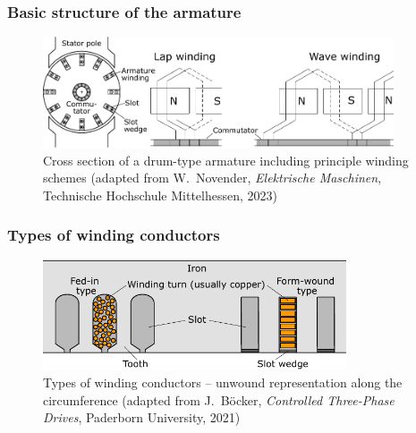 \begin{frame}
	\frametitle{Basic structure of the armature}
    \begin{figure}
        \centering
        \includegraphics[width=0.925\textwidth]{fig/lec03/Armature_slots.pdf}
        \caption{Cross section of a drum-type armature including principle winding schemes (adapted from W.~Novender, \textit{Elektrische Maschinen}, Technische Hochschule Mittelhessen, 2023)}
    \end{figure}
\end{frame}

\begin{frame}
	\frametitle{Types of winding conductors}
    \begin{figure}
        \centering
        \includegraphics[width=0.8\textwidth]{fig/lec03/Winding_turn_types.pdf}
        \caption{Types of winding conductors -- unwound representation along the circumference (adapted from J.~B\"ocker, \textit{Controlled Three-Phase Drives}, Paderborn University, 2021)}
    \end{figure}
\end{frame}


